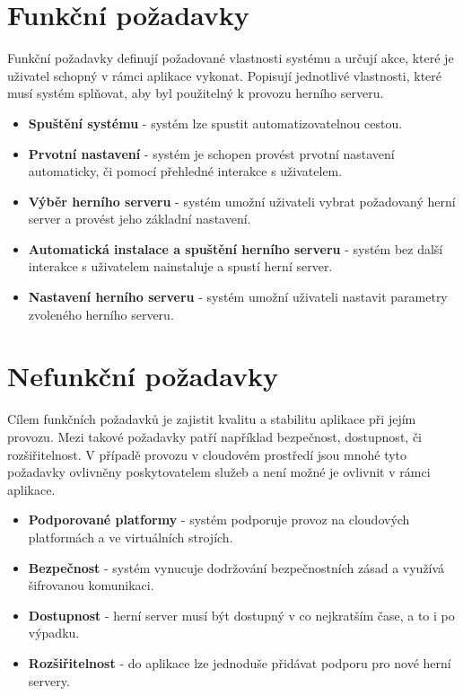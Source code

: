 \section{Funkční požadavky}

Funkční požadavky definují požadované vlastnosti systému a určují akce, které je uživatel schopný v rámci aplikace vykonat.
Popisují jednotlivé vlastnosti, které musí systém splňovat, aby byl použitelný k provozu herního serveru.

\begin{itemize}
    \item \textbf{Spuštění systému} - systém lze spustit automatizovatelnou cestou.
    \item \textbf{Prvotní nastavení} - systém je schopen provést prvotní nastavení automaticky, či pomocí přehledné interakce s uživatelem. 
    \item \textbf{Výběr herního serveru} - systém umožní uživateli vybrat požadovaný herní server a provést jeho základní nastavení.
    \item \textbf{Automatická instalace a spuštění herního serveru} - systém bez další interakce s uživatelem nainstaluje a spustí herní server.
    \item \textbf{Nastavení herního serveru} - systém umožní uživateli nastavit parametry zvoleného herního serveru.
\end{itemize}

\section{Nefunkční požadavky}

Cílem funkčních požadavků je zajistit kvalitu a stabilitu aplikace při jejím provozu. Mezi takové požadavky patří například bezpečnost, dostupnost, či rozšiřitelnost.
V případě provozu v cloudovém prostředí jsou mnohé tyto požadavky ovlivněny poskytovatelem služeb a není možné je ovlivnit v rámci aplikace.

\begin{itemize}
    \item \textbf{Podporované platformy} - systém podporuje provoz na cloudových platformách a ve virtuálních strojích.
    \item \textbf{Bezpečnost} - systém vynucuje dodržování bezpečnostních zásad a využívá šifrovanou komunikaci.
    \item \textbf{Dostupnost} - herní server musí být dostupný v co nejkratším čase, a to i po výpadku.
    \item \textbf{Rozšiřitelnost} - do aplikace lze jednoduše přidávat podporu pro nové herní servery.
\end{itemize}

